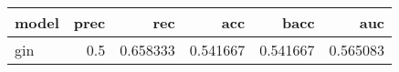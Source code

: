 \begin{tabular}{lrrrrr}
\toprule
model &  prec &      rec &      acc &     bacc &      auc \\
\midrule
  gin &   0.5 & 0.658333 & 0.541667 & 0.541667 & 0.565083 \\
\bottomrule
\end{tabular}

